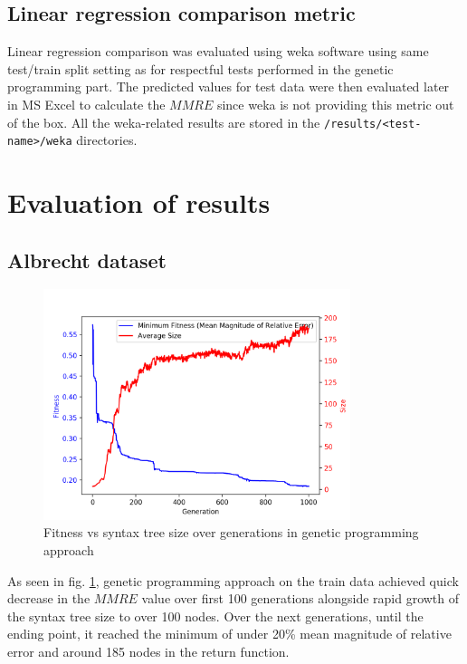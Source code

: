 \documentclass[12pt]{article}
\begin{document}
\subsection{Linear regression comparison metric}
Linear regression comparison was evaluated using weka software using same test/train split setting as for respectful tests performed in the genetic programming part. The predicted values for test data were then evaluated later in MS Excel to calculate the $MMRE$ since weka is not providing this metric out of the box. All the weka-related results are stored in the \texttt{/results/<test-name>/weka} directories.

\section{Evaluation of results}

\subsection{Albrecht dataset}

\begin{figure}[H]
  \centering
  \includegraphics[width=0.8\textwidth]{results/albrecht/mmre_vs_size}
  \caption{Fitness vs syntax tree size over generations in genetic programming approach}
  \label{fit_vs_syn_albrecht}
\end{figure}
As seen in fig. \ref{fit_vs_syn_albrecht}, genetic programming approach on the train data achieved quick decrease in the $MMRE$ value over first 100 generations alongside rapid growth of the syntax tree size to over 100 nodes. Over the next generations, until the ending point, it reached the minimum of under 20\% mean magnitude of relative error and around 185 nodes in the return function.
\end{document}
